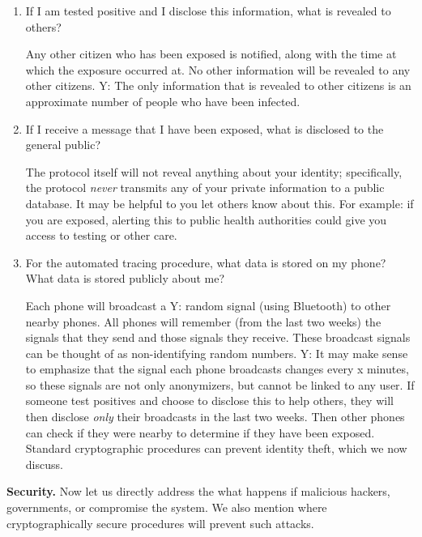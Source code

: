 \documentclass{article}
\newcommand{\TODO}[1]{ {\color{blue} #1 }}
\begin{document}
\begin{enumerate}[leftmargin=*]
\item If I am tested positive and I disclose this information, what is revealed to others?

Any other citizen who has been exposed is notified, along with the time at which the exposure occurred at. No other information will be revealed to any other citizens. \TODO{Y:  The only information that is revealed to other citizens is an approximate number of people who have been infected.}

\item If I receive a message that I have been exposed, what is disclosed to the general public? 
 
The protocol itself will not reveal anything about your identity; specifically, the protocol \emph{never} transmits any of your private information to a public database. It may be helpful to you let others know about this. For example: if you are exposed, alerting this to public health authorities could give you access to testing or other care. 

\item For the automated tracing procedure, what data is stored on my phone? What data is stored publicly about me?

Each phone will broadcast a \TODO{Y: random} signal (using Bluetooth) to other nearby phones. All phones will remember (from the last two weeks) the signals that they send and those signals they receive. These broadcast signals can be thought of as non-identifying random numbers. \TODO{Y: It may make sense to emphasize that the signal each phone broadcasts changes every x minutes, so these signals are not only anonymizers, but cannot be linked to any user.}  If someone test positives and choose to disclose this to help others, they will then disclose \emph{only} their broadcasts in the last two weeks. Then other phones can check if they were nearby to determine if they have been exposed. Standard cryptographic procedures can prevent identity theft, which we now discuss.

\end{enumerate}

\textbf{Security.} Now let us directly address the what happens if malicious hackers, governments, or compromise the system. We also mention where cryptographically secure procedures will prevent such attacks.   
\end{document}
